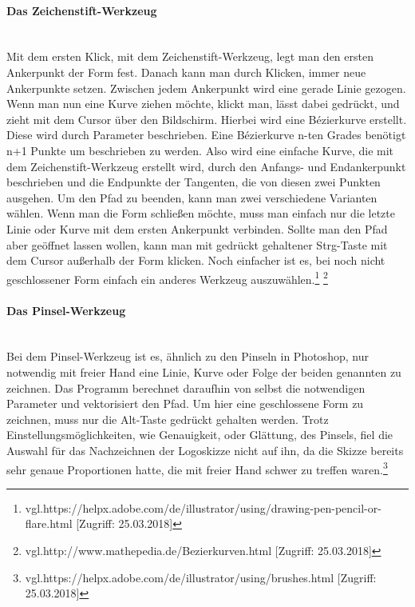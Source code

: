 \paragraph{Das Zeichenstift-Werkzeug}
\leavevmode \\
Mit dem ersten Klick, mit dem Zeichenstift-Werkzeug, legt man den ersten Ankerpunkt der Form fest. Danach kann man durch Klicken, immer neue Ankerpunkte setzen. Zwischen jedem Ankerpunkt wird eine gerade Linie gezogen. Wenn man nun eine Kurve ziehen möchte, klickt man, lässt dabei gedrückt, und zieht mit dem Cursor über den Bildschirm. Hierbei wird eine Bézierkurve erstellt. Diese wird durch Parameter beschrieben. Eine Bézierkurve n-ten Grades benötigt n+1 Punkte um beschrieben zu werden. Also wird eine einfache Kurve, die mit dem Zeichenstift-Werkzeug erstellt wird, durch den Anfangs- und Endankerpunkt beschrieben und die Endpunkte der Tangenten, die von diesen zwei Punkten ausgehen. Um den Pfad zu beenden, kann man zwei verschiedene Varianten wählen. Wenn man die Form schließen möchte, muss man einfach nur die letzte Linie oder Kurve mit dem ersten Ankerpunkt verbinden. Sollte man den Pfad aber geöffnet lassen wollen, kann man mit gedrückt gehaltener Strg-Taste mit dem Cursor außerhalb der Form klicken. Noch einfacher ist es, bei noch nicht geschlossener Form einfach ein anderes Werkzeug auszuwählen.\footnote{\label{} vgl.https://helpx.adobe.com/de/illustrator/using/drawing-pen-pencil-or-flare.html	[Zugriff: 25.03.2018]} \footnote{\label{} vgl.http://www.mathepedia.de/Bezierkurven.html [Zugriff: 25.03.2018]}
\leavevmode \\

\paragraph{Das Pinsel-Werkzeug}
\leavevmode \\
Bei dem Pinsel-Werkzeug ist es, ähnlich zu den Pinseln in Photoshop, nur notwendig mit freier Hand eine Linie, Kurve oder Folge der beiden genannten zu zeichnen. Das Programm berechnet daraufhin von selbst die notwendigen Parameter und vektorisiert den Pfad. Um hier eine geschlossene Form zu zeichnen, muss nur die Alt-Taste gedrückt gehalten werden. Trotz Einstellungsmöglichkeiten, wie Genauigkeit, oder Glättung, des Pinsels, fiel die Auswahl für das Nachzeichnen der Logoskizze nicht auf ihn, da die Skizze bereits sehr genaue Proportionen hatte, die mit freier Hand schwer zu treffen waren.\footnote{\label{} vgl.https://helpx.adobe.com/de/illustrator/using/brushes.html [Zugriff: 25.03.2018]}
\leavevmode \\


